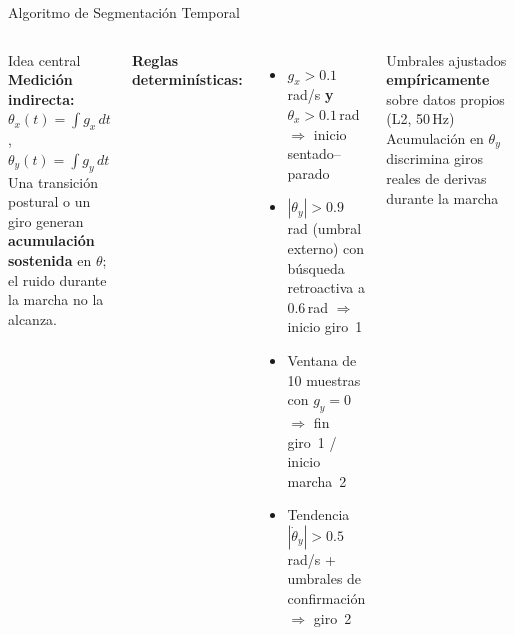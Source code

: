 \documentclass[10pt,aspectratio=169]{beamer}
\begin{document}
\begin{frame}{Algoritmo de Segmentación Temporal}
  \begin{columns}[t]
      \begin{block}{Idea central}
        \textbf{Medición indirecta:}
        $\theta_x(t) = \int g_x\,dt$,\;\;
        $\theta_y(t) = \int g_y\,dt$\\[0.4em]
        Una transición postural o un giro generan
        \textbf{acumulación sostenida} en $\theta$;
        el ruido durante la marcha no la alcanza.
      \end{block}
      \vspace{0.4em}
      \textbf{Reglas determinísticas:}
      \begin{itemize}
        \small
        \item $g_x > 0.1$\,rad/s \textbf{y} $\theta_x > 0.1$\,rad
              $\Rightarrow$ inicio sentado--parado
        \item $|\theta_y| > 0.9$\,rad (umbral externo) con búsqueda
              retro\-activa a 0.6\,rad $\Rightarrow$ inicio giro~1
        \item Ventana de 10 muestras con $g_y = 0$
              $\Rightarrow$ fin giro~1 / inicio marcha~2
        \item Tendencia $|\dot\theta_y| > 0.5$\,rad/s
              + umbrales de confirmación $\Rightarrow$ giro~2
      \end{itemize}
      \vspace{0.2em}
      {\small Umbrales ajustados \textbf{empíricamente} sobre datos propios (L2, 50\,Hz)}
      \centering
      {\tiny Acumulación en $\theta_y$ discrimina giros reales de derivas durante la marcha}
  \end{columns}
\end{frame}
\end{document}
